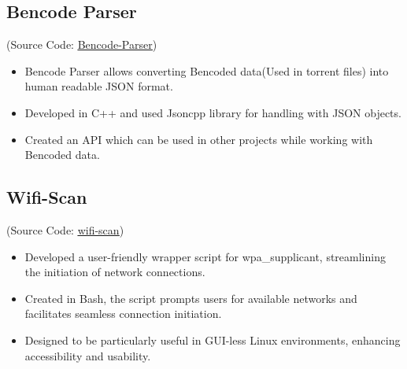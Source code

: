 \documentclass[10pt,a5paper]{article}
\begin{document}
\subsection{Bencode Parser}
\hfill (Source Code: \href{https://github.com/v1n0dh/Bencode-Parser}{\underline {Bencode-Parser}})
\begin{itemize}[leftmargin=6mm]
	\setlength\itemsep{0em}
	\item{Bencode Parser allows converting Bencoded data(Used in torrent files) into human readable JSON format.}
	\item{Developed in C++ and used Jsoncpp library for handling with JSON objects.}
	\item{Created an API which can be used in other projects while working with Bencoded data.}
\end{itemize}
\vspace*{-0.5em}

\subsection{Wifi-Scan}
\hfill (Source Code: \href{https://github.com/v1n0dh/dotfiles/blob/master/.scripts/wifi-scan}{\underline {wifi-scan}})
\begin{itemize}[leftmargin=6mm]
	\setlength\itemsep{0em}
	\item{Developed a user-friendly wrapper script for wpa\_supplicant, streamlining the initiation of network connections.}
	\item{Created in Bash, the script prompts users for available networks and facilitates seamless connection initiation.}
	\item{Designed to be particularly useful in GUI-less Linux environments, enhancing accessibility and usability.}
\end{itemize}
\end{document}
